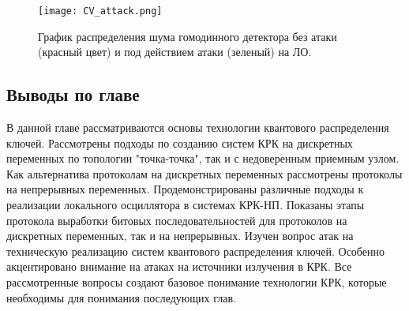 \begin{figure}
    \centering
    \texttt{[image: CV\_attack.png]}
    \caption{График распределения шума гомодинного детектора без атаки (красный цвет) и под действием атаки (зеленый) на ЛО.}
    \label{fig:CV_attack}
\end{figure}
\subsection{Выводы по главе}\label{sec:ch1/sect8}
В данной главе рассматриваются основы технологии квантового распределения ключей. Рассмотрены подходы по созданию систем КРК на дискретных переменных по топологии "точка-точка", так и с недоверенным приемным узлом. Как альтернатива протоколам на дискретных переменных рассмотрены протоколы на непрерывных переменных. Продемонстрированы  различные подходы к реализации локального осциллятора в системах КРК-НП. Показаны этапы протокола выработки битовых последовательностей для протоколов на дискретных переменных, так и на непрерывных.
Изучен вопрос атак на техническую реализацию систем квантового распределения ключей. Особенно акцентировано внимание на атаках на источники излучения в КРК. Все рассмотренные вопросы создают базовое понимание технологии КРК, которые необходимы для понимания последующих глав.